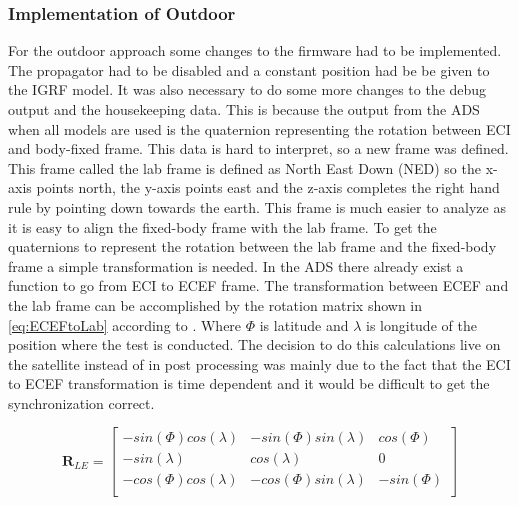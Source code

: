 \subsubsection{Implementation of Outdoor}
For the outdoor approach some changes to the firmware had to be implemented. The propagator had to be disabled and a constant position had be be given to the IGRF model. It was also necessary to do some more changes to the debug output and the housekeeping data. This is because the output from the ADS when all models are used is the quaternion representing the rotation between ECI and body-fixed frame. This data is hard to interpret, so a new frame was defined. This frame called the lab frame is defined as North East Down (NED) so the x-axis points north, the y-axis points east and the z-axis completes the right hand rule by pointing down towards the earth. This frame is much easier to analyze as it is easy to align the fixed-body frame with the lab frame. To get the quaternions to represent the rotation between the lab frame and the fixed-body frame a simple transformation is needed. In the ADS there already exist a function to go from ECI to ECEF frame. The transformation between ECEF and the lab frame can be accomplished by the rotation matrix shown in \autoref{eq:ECEFtoLab} according to \cite{UWE-3}. Where $\Phi$ is latitude and $\lambda$ is longitude of the position where the test is conducted. The decision to do this calculations live on the satellite instead of in post processing was mainly due to the fact that the ECI to ECEF transformation is time dependent and it would be difficult to get the synchronization correct.    

\begin{equation}\label{eq:ECEFtoLab}
	\boldsymbol{R}_{LE} = \begin{bmatrix}
		-sin(\Phi)cos(\lambda) & -sin(\Phi)sin(\lambda) & cos(\Phi) \\
		-sin(\lambda) & cos(\lambda) & 0 \\
		-cos(\Phi)cos(\lambda) & -cos(\Phi)sin(\lambda) & -sin(\Phi) \\
	\end{bmatrix}
\end{equation}                       

